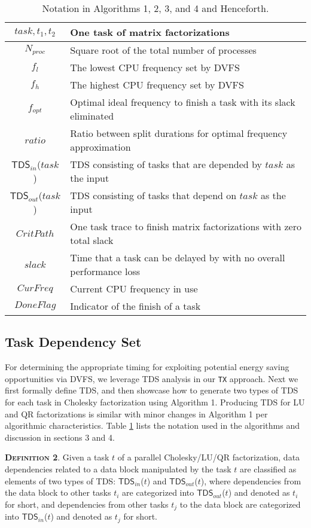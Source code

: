 \documentclass[12pt]{elsarticle}
\begin{document}
\begin{table}\small \centering
\caption{Notation in Algorithms 1, 2, 3, and 4 and Henceforth.}
\label{notation1}
\begin{tabular}{|c|l|}
\hline
$task, t_1, t_2$ & One task of matrix factorizations\\\hline
$N_{proc}$ & Square root of the total number of processes\\
\hline
$f_l$ & The lowest CPU frequency set by DVFS\\
\hline
$f_h$ & The highest CPU frequency set by DVFS\\
\hline
$f_{opt}$ & Optimal ideal frequency to finish a task with its slack eliminated\\\hline
$ratio$ & Ratio between split durations for optimal frequency approximation\\
\hline
$\mathsf{TDS}_{in}$\textsf{($task$)} & TDS consisting of tasks that are depended by $task$ as the input\\ \hline
$\mathsf{TDS}_{out}$\textsf{($task$)} & TDS consisting of tasks that depend on $task$ as the input\\ \hline
$CritPath$ & One task trace to finish matrix factorizations with zero total slack\\\hline
$slack$ & Time that a task can be delayed by with no overall performance loss\\
\hline
$CurFreq$ & Current CPU frequency in use\\
\hline
$DoneFlag$ & Indicator of the finish of a task\\
\hline
\end{tabular}
\normalsize
\end{table}

\subsection{Task Dependency Set}

For determining the appropriate timing for exploiting potential energy saving opportunities via DVFS, we leverage TDS analysis in our \texttt{TX} approach. Next we first formally define TDS, and then showcase how to generate two types of TDS for each task in Cholesky factorization using Algorithm 1. Producing TDS for LU and QR factorizations is similar with minor changes in Algorithm 1 per algorithmic characteristics. Table \ref{notation1} lists the notation used in the algorithms and discussion in sections 3 and 4.

\vspace{1mm}
\noindent\textsc{\textbf{Definition 2}}. Given a task $t$ of a parallel Cholesky/LU/QR factorization, data dependencies related to a data block manipulated by the task $t$ are classified as elements of two types of TDS: $\mathsf{TDS}_{in}$\textsf{($t$)} and $\mathsf{TDS}_{out}$\textsf{($t$)}, where dependencies from the data block to other tasks $t_i$ are categorized into $\mathsf{TDS}_{out}$\textsf{($t$)} and denoted as $t_i$ for short, and dependencies from other tasks $t_j$ to the data block are categorized into $\mathsf{TDS}_{in}$\textsf{($t$)} and denoted as $t_j$ for short.
\end{document}
